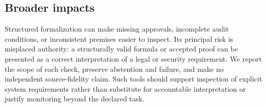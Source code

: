 \subsection{Broader impacts}
\label{app:impacts}
Structured formalization can make missing approvals, incomplete audit
conditions, or inconsistent premises easier to inspect. Its principal
risk is misplaced authority: a structurally valid formula or accepted
proof can be presented as a correct interpretation of a legal or security
requirement. We report the scope of each check, preserve abstention and
failure, and make no independent source-fidelity claim. Such tools should
support inspection of explicit system requirements rather than substitute
for accountable interpretation or justify monitoring beyond the declared
task.
